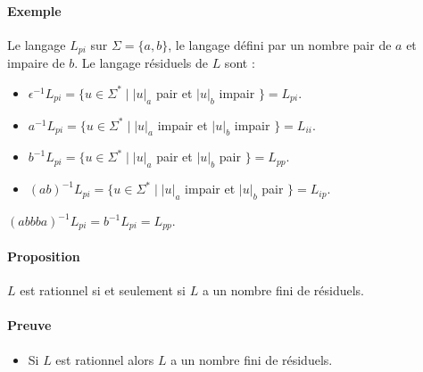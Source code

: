 

\paragraph{Exemple} %
\label{par:exemple}

Le langage $L_{pi}$ sur $\Sigma = \{a,b\}$, le langage défini par un nombre pair de $a$ et impaire de $b$. Le langage résiduels de $L$ sont :

\begin{itemize}
	\item $\epsilon^{-1}L_{pi} = \{ u \in \Sigma^* \mid \left|u\right|_a$ pair et $ \left|u\right|_b$ impair $ \} = L_{pi}$.
	\item $a^{-1}L_{pi} = \{ u \in \Sigma^* \mid \left|u\right|_a$ impair et $ \left|u\right|_b$ impair $ \} = L_{ii}$.
	\item $b^{-1}L_{pi} = \{ u \in \Sigma^* \mid \left|u\right|_a$ pair et $ \left|u\right|_b$ pair $ \} = L_{pp}$.
	\item $(ab)^{-1}L_{pi} = \{ u \in \Sigma^* \mid \left|u\right|_a$ impair et $ \left|u\right|_b$ pair $ \} = L_{ip}$.\\
\end{itemize}

$(abbba)^{-1}L_{pi} = b^{-1} L_{pi} = L_{pp}$.



\paragraph{Proposition} %
\label{par:proposition}

$L$ est rationnel si et seulement si $L$ a un nombre fini de résiduels.



\paragraph{Preuve} %
\label{par:preuve}

\begin{itemize}
	\item Si $L$ est rationnel alors $L$ a un nombre fini de résiduels.
\end{itemize}





